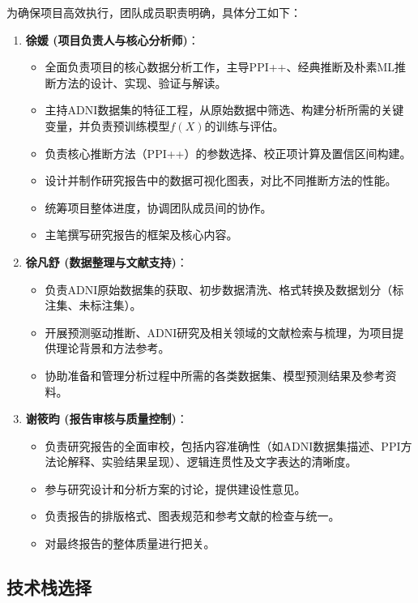 \documentclass[12pt,a4paper]{article}
\begin{document}
为确保项目高效执行，团队成员职责明确，具体分工如下：

\begin{enumerate}
    \item \textbf{徐媛 (项目负责人与核心分析师)}：
    \begin{itemize}
        \item 全面负责项目的核心数据分析工作，主导PPI++、经典推断及朴素ML推断方法的设计、实现、验证与解读。
        \item 主持ADNI数据集的特征工程，从原始数据中筛选、构建分析所需的关键变量，并负责预训练模型$f(X)$的训练与评估。
        \item 负责核心推断方法（PPI++）的参数选择、校正项计算及置信区间构建。
        \item 设计并制作研究报告中的数据可视化图表，对比不同推断方法的性能。
        \item 统筹项目整体进度，协调团队成员间的协作。
        \item 主笔撰写研究报告的框架及核心内容。
    \end{itemize}

    \item \textbf{徐凡舒 (数据整理与文献支持)}：
    \begin{itemize}
        \item 负责ADNI原始数据集的获取、初步数据清洗、格式转换及数据划分（标注集、未标注集）。
        \item 开展预测驱动推断、ADNI研究及相关领域的文献检索与梳理，为项目提供理论背景和方法参考。
        \item 协助准备和管理分析过程中所需的各类数据集、模型预测结果及参考资料。
    \end{itemize}

    \item \textbf{谢筱昀 (报告审核与质量控制)}：
    \begin{itemize}
        \item 负责研究报告的全面审校，包括内容准确性（如ADNI数据集描述、PPI方法论解释、实验结果呈现）、逻辑连贯性及文字表达的清晰度。
        \item 参与研究设计和分析方案的讨论，提供建设性意见。
        \item 负责报告的排版格式、图表规范和参考文献的检查与统一。
        \item 对最终报告的整体质量进行把关。
    \end{itemize}
\end{enumerate}

\subsection{技术栈选择}
\end{document}
